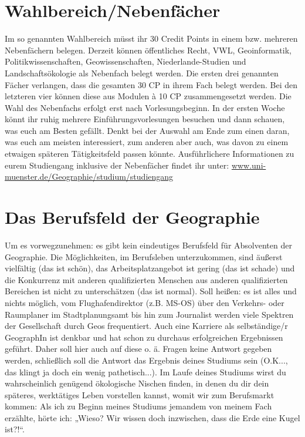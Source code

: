 \section*{Wahlbereich/Nebenfächer}
Im so genannten Wahlbereich müsst ihr 30 Credit Points in einem bzw. mehreren Nebenfächern belegen. Derzeit können öffentliches Recht, VWL, Geoinformatik, Politikwissenschaften, Geowissenschaften, Niederlande-Studien und Landschaftsökologie als Nebenfach belegt werden. Die ersten drei genannten Fächer verlangen, dass die gesamten 30 CP in ihrem Fach belegt werden. Bei den letzteren vier können diese aus Modulen à 10 CP zusammengesetzt werden. Die Wahl des Nebenfachs erfolgt erst nach Vorlesungsbeginn. In der ersten Woche könnt ihr ruhig mehrere Einführungsvorlesungen besuchen und dann schauen, was euch am Besten gefällt. Denkt bei der Auswahl am Ende zum einen daran, was euch am meisten interessiert, zum anderen aber auch, was davon zu einem etwaigen späteren Tätigkeitsfeld passen könnte. Ausführlichere Informationen zu eurem Studiengang inklusive der Nebenfächer ﬁndet ihr unter: \url{www.uni-muenster.de/Geographie/studium/studiengang}

\section*{Das Berufsfeld der Geographie}
Um es vorwegzunehmen: es gibt kein eindeutiges Berufsfeld für Absolventen der Geographie. Die Möglichkeiten, im Berufsleben unterzukommen, sind äußerst vielfältig (das ist schön), das Arbeitsplatzangebot ist gering (das ist schade) und die Konkurrenz mit anderen qualifizierten Menschen aus anderen qualifizierten Bereichen ist nicht zu unterschätzen (das ist normal). Soll heißen: es ist alles und nichts möglich, vom Flughafendirektor (z.B. MS-OS) über den Verkehrs- oder Raumplaner im Stadtplanungsamt bis hin zum Journalist werden viele Spektren der Gesellschaft durch Geos frequentiert. Auch eine Karriere als selbständige/r GeographIn ist denkbar und hat schon zu durchaus erfolgreichen Ergebnissen geführt. Daher soll hier auch auf diese o. ä. Fragen keine Antwort gegeben werden, schließlich soll die Antwort das Ergebnis deines Studiums sein (O.K..., das klingt ja doch ein wenig pathetisch...). Im Laufe deines Studiums wirst du wahrscheinlich genügend ökologische Nischen ﬁnden, in denen du dir dein späteres, werktätiges Leben vorstellen kannst, womit wir zum Berufsmarkt kommen: Als ich zu Beginn meines Studiums jemandem von meinem Fach erzählte, hörte ich: „Wieso? Wir wissen doch inzwischen, dass die Erde eine Kugel ist?!“.

